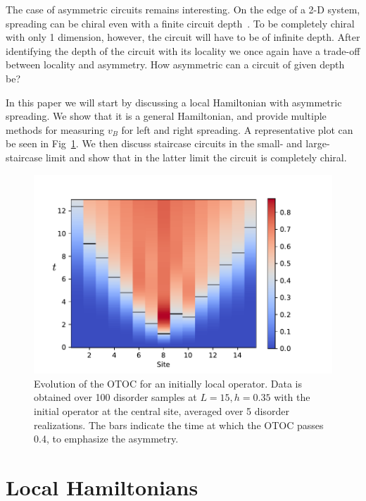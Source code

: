 \documentclass[aps,prx,reprint,superscriptaddress, longbibliography]{revtex4-1}
\newcommand{\charlie}[1]{{\color{Magenta}{{#1}}}}
\begin{document}
The case of asymmetric circuits remains interesting. On the edge of a 2-D system, spreading can be chiral even with a finite circuit depth~\cite{PoChiralCircuit}. To be completely chiral with only 1 dimension, however, the circuit will have to be of infinite depth. After identifying the depth of the circuit with its locality \charlie{(how?)} we once again have a trade-off between locality and asymmetry. How asymmetric can a circuit of given depth be?

In this paper we will start by discussing a local Hamiltonian with asymmetric spreading. We show that it is a general Hamiltonian, and provide multiple methods for measuring $v_B$ for left and right spreading. A representative plot can be seen in Fig~\ref{fig:colorplot}. We then discuss staircase circuits in the small- and large-staircase limit and show that in the latter limit the circuit is completely chiral.


\begin{figure}
	\includegraphics[width=\columnwidth]{colorplot}
	\caption{Evolution of the OTOC for an initially local operator. Data is obtained over 100 disorder samples at $L=15, h=0.35$ with the initial operator at the central site, averaged over 5 disorder realizations. The bars indicate the time at which the OTOC passes 0.4, to emphasize the asymmetry.}
	\label{fig:colorplot}
\end{figure}


\section{Local Hamiltonians}

\end{document}
